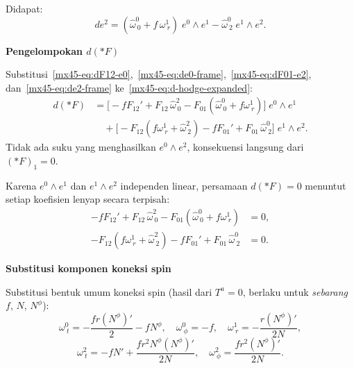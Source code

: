 \noindent Didapat:
\begin{equation}
    de^2 = \left(\hat\omega^0_{\ 0} + f\,\omega^1_{\ r}\right)\;e^0 \wedge e^1 - \hat\omega^0_{\ 2}\;e^1 \wedge e^2. \label{mx45-eq:de2-frame}
\end{equation}

\vspace{0.5em}
\noindent \textbf{Pengelompokan $d(*F)$}

Substitusi~\eqref{mx45-eq:dF12-e0},~\eqref{mx45-eq:de0-frame},~\eqref{mx45-eq:dF01-e2}, dan~\eqref{mx45-eq:de2-frame} ke~\eqref{mx45-eq:d-hodge-expanded}:
\begin{align}
    d(*F)
    &= \Big[-fF_{12}' + F_{12}\,\hat\omega^2_{\ 0}
    - F_{01}\!\left(\hat\omega^0_{\ 0} + f\omega^1_{\ r}\right)\Big]\;e^0 \wedge e^1 \nonumber\\[6pt]
    &\quad + \Big[-F_{12}\!\left(f\omega^1_{\ r} + \hat\omega^2_{\ 2}\right)
    - fF_{01}' + F_{01}\,\hat\omega^0_{\ 2}\Big]\;e^1 \wedge e^2.
    \label{mx45-eq:d-hodge-grouped}
\end{align}
Tidak ada suku yang menghasilkan $e^0 \wedge e^2$, konsekuensi langsung dari $(*F)_1 = 0$.

Karena $e^0 \wedge e^1$ dan $e^1 \wedge e^2$ independen linear, persamaan $d({*F}) = 0$ menuntut setiap koefisien lenyap secara terpisah:
\begin{align}
    -fF_{12}' + F_{12}\,\hat\omega^2_{\ 0}
    - F_{01}\!\left(\hat\omega^0_{\ 0} + f\omega^1_{\ r}\right) &= 0,
    \label{mx45-eq:maxwell-01}\\[8pt]
    -F_{12}\!\left(f\omega^1_{\ r} + \hat\omega^2_{\ 2}\right)
    - fF_{01}' + F_{01}\,\hat\omega^0_{\ 2} &= 0.
    \label{mx45-eq:maxwell-12}
\end{align}

\vspace{0.5em}
\noindent \textbf{Substitusi komponen koneksi spin}

Substitusi bentuk umum koneksi spin (hasil dari $T^a = 0$, berlaku untuk \emph{sebarang} $f$, $N$, $N^\phi$):
\begin{equation}
    \omega^0_{\ t} = -\frac{fr(N^\phi)'}{2} - fN^\phi, \quad
    \omega^0_{\ \phi} = -f, \quad
    \omega^1_{\ r} = -\frac{r(N^\phi)'}{2N},
\end{equation}
\begin{equation}
    \omega^2_{\ t} = -fN' + \frac{fr^2N^\phi(N^\phi)'}{2N}, \quad
    \omega^2_{\ \phi} = \frac{fr^2(N^\phi)'}{2N}.
\end{equation}

